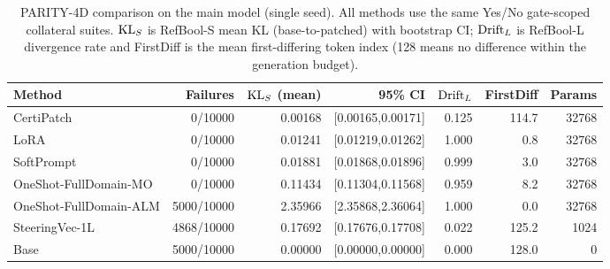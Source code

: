 \begin{table}[t]
\centering
\scriptsize
\setlength{\tabcolsep}{3pt}
\begin{tabular}{lrrrrrr}
\toprule
Method & Failures & $\mathrm{KL}_{S}$ (mean) & 95\% CI & $\mathrm{Drift}_{L}$ & FirstDiff & Params \\
\midrule
CertiPatch & 0/10000 & 0.00168 & [0.00165,0.00171] & 0.125 & 114.7 & 32768 \\
LoRA & 0/10000 & 0.01241 & [0.01219,0.01262] & 1.000 & 0.8 & 32768 \\
SoftPrompt & 0/10000 & 0.01881 & [0.01868,0.01896] & 0.999 & 3.0 & 32768 \\
OneShot-FullDomain-MO & 0/10000 & 0.11434 & [0.11304,0.11568] & 0.959 & 8.2 & 32768 \\
OneShot-FullDomain-ALM & 5000/10000 & 2.35966 & [2.35868,2.36064] & 1.000 & 0.0 & 32768 \\
SteeringVec-1L & 4868/10000 & 0.17692 & [0.17676,0.17708] & 0.022 & 125.2 & 1024 \\
Base & 5000/10000 & 0.00000 & [0.00000,0.00000] & 0.000 & 128.0 & 0 \\
\bottomrule
\end{tabular}
\caption{PARITY-4D comparison on the main model (single seed). All methods use the same Yes/No gate-scoped collateral suites. $\mathrm{KL}_{S}$ is RefBool-S mean KL (base-to-patched) with bootstrap CI; $\mathrm{Drift}_{L}$ is RefBool-L divergence rate and FirstDiff is the mean first-differing token index (128 means no difference within the generation budget).}
\label{tab:parity_baselines}
\end{table}